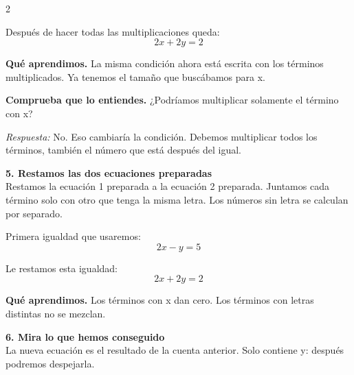 \documentclass[11pt,a4paper,landscape]{article}
\begin{document}
\begin{multicols*}{2}
\begin{minipage}{\linewidth}
\par\smallskip Después de hacer todas las multiplicaciones queda:
\[2x + 2y = 2\]
\par\smallskip\textbf{Qué aprendimos.} La misma condición ahora está escrita con los términos multiplicados. Ya tenemos el tamaño que buscábamos para x.
\par\smallskip\textbf{Comprueba que lo entiendes.} ¿Podríamos multiplicar solamente el término con x?\par\textit{Respuesta:} No. Eso cambiaría la condición. Debemos multiplicar todos los términos, también el número que está después del igual.
\end{minipage}\par\medskip
\noindent\begin{minipage}{\linewidth}\textbf{5. Restamos las dos ecuaciones preparadas}\\[2pt]Restamos la ecuación 1 preparada a la ecuación 2 preparada. Juntamos cada término solo con otro que tenga la misma letra. Los números sin letra se calculan por separado.
\par{}\par\smallskip
\par\smallskip Primera igualdad que usaremos:
\[2x - y = 5\]
\par\smallskip Le restamos esta igualdad:
\[2x + 2y = 2\]
\par\smallskip\textbf{Qué aprendimos.} Los términos con x dan cero. Los términos con letras distintas no se mezclan.
\end{minipage}\par\medskip
\noindent\begin{minipage}{\linewidth}\textbf{6. Mira lo que hemos conseguido}\\[2pt]La nueva ecuación es el resultado de la cuenta anterior. Solo contiene y: después podremos despejarla.

\end{minipage}
\end{multicols*}
\end{document}
